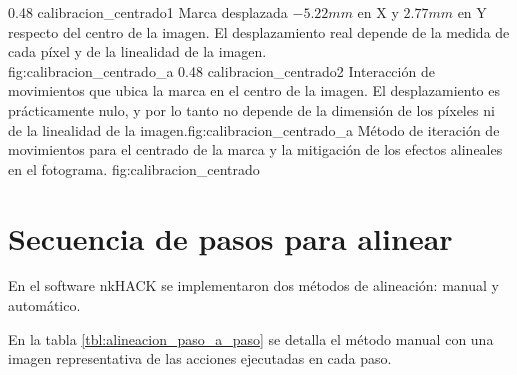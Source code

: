 \subfigab
{0.48} {calibracion_centrado1} {Marca desplazada $-5.22mm$ en X y $2.77mm$ en Y respecto del centro de la imagen. El desplazamiento real depende de la medida de cada píxel y de la linealidad de la imagen.\\ \vphantom{1}}{fig:calibracion_centrado_a}
{0.48} {calibracion_centrado2} {Interacción de movimientos que ubica la marca en el centro de la imagen. El desplazamiento es prácticamente nulo, y por lo tanto no depende de la dimensión de los píxeles ni de la linealidad de la imagen.}{fig:calibracion_centrado_a}
   {Método de iteración de movimientos para el centrado de la marca y la mitigación de los efectos alineales en el fotograma.}
   {fig:calibracion_centrado}

\section{Secuencia de pasos para alinear}

En el software nkHACK se implementaron dos métodos de alineación: manual y automático.\par
En la tabla \ref{tbl:alineacion_paso_a_paso} se detalla el método manual con una imagen representativa de las acciones ejecutadas en cada paso.


